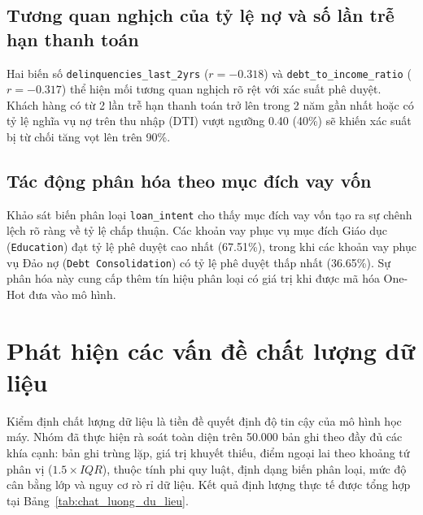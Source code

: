 \documentclass[12pt,a4paper,oneside]{report}
\begin{document}
\subsection{Tương quan nghịch của tỷ lệ nợ và số lần trễ hạn thanh toán}
Hai biến số \texttt{delinquencies\_last\_2yrs} ($r = -0.318$) và \texttt{debt\_to\_income\_ratio} ($r = -0.317$) thể hiện mối tương quan nghịch rõ rệt với xác suất phê duyệt. Khách hàng có từ 2 lần trễ hạn thanh toán trở lên trong 2 năm gần nhất hoặc có tỷ lệ nghĩa vụ nợ trên thu nhập (DTI) vượt ngưỡng 0.40 (40\%) sẽ khiến xác suất bị từ chối tăng vọt lên trên 90\%.

\subsection{Tác động phân hóa theo mục đích vay vốn}
Khảo sát biến phân loại \texttt{loan\_intent} cho thấy mục đích vay vốn tạo ra sự chênh lệch rõ ràng về tỷ lệ chấp thuận. Các khoản vay phục vụ mục đích Giáo dục (\texttt{Education}) đạt tỷ lệ phê duyệt cao nhất (67.51\%), trong khi các khoản vay phục vụ Đảo nợ (\texttt{Debt Consolidation}) có tỷ lệ phê duyệt thấp nhất (36.65\%). Sự phân hóa này cung cấp thêm tín hiệu phân loại có giá trị khi được mã hóa One-Hot đưa vào mô hình.

\section{Phát hiện các vấn đề chất lượng dữ liệu}

Kiểm định chất lượng dữ liệu là tiền đề quyết định độ tin cậy của mô hình học máy. Nhóm đã thực hiện rà soát toàn diện trên 50.000 bản ghi theo đầy đủ các khía cạnh: bản ghi trùng lặp, giá trị khuyết thiếu, điểm ngoại lai theo khoảng tứ phân vị ($1.5 \times IQR$), thuộc tính phi quy luật, định dạng biến phân loại, mức độ cân bằng lớp và nguy cơ rò rỉ dữ liệu. Kết quả định lượng thực tế được tổng hợp tại Bảng~\ref{tab:chat_luong_du_lieu}.
\end{document}
